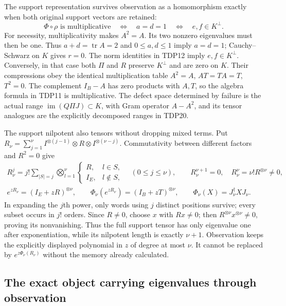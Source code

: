 The support representation survives observation as a homomorphism
exactly when both original support vectors are retained:
\begin{equation}\tag{TDP22}
\Phi\circ\rho\text{ is multiplicative}\quad\Longleftrightarrow\quad
a=d=1\quad\Longleftrightarrow\quad e,f\in K^\perp.
\end{equation}
For necessity, multiplicativity makes $A^2=A$. Its two nonzero
eigenvalues must then be one. Thus $a+d=\operatorname{tr}A=2$ and
$0\le a,d\le1$ imply $a=d=1$; Cauchy--Schwarz on $K$ gives $r=0$.
The norm identities in TDP12 imply $e,f\in K^\perp$. Conversely, in
that case both $\Pi$ and $R$ preserve $K^\perp$ and are zero on $K$.
Their compressions obey the identical multiplication table
$A^2=A$, $AT=TA=T$, $T^2=0$. The complement $I_B-A$ has zero products
with $A,T$, so the algebra formula in TDP11 is multiplicative.
The defect space determined by failure is the actual range
$\operatorname{im}(Q\Pi J)\subset K$, with Gram operator $A-A^2$,
and its tensor analogues are the explicitly decomposed ranges in TDP20.

The support nilpotent also tensors without dropping mixed terms. Put
$R_\nu=\sum_{j=1}^\nu I^{\otimes(j-1)}\otimes R\otimes I^{\otimes(\nu-j)}$.
Commutativity between different factors and $R^2=0$ give
\begin{equation}\tag{TDP23}
\begin{gathered}
R_\nu^j=j!\sum_{|S|=j}\bigotimes_{l=1}^\nu
 \begin{cases}R,&l\in S,\\I_E,&l\notin S,\end{cases}
\quad (0\le j\le\nu),\qquad
R_\nu^{\nu+1}=0,\quad R_\nu^\nu=\nu!R^{\otimes\nu}\ne0,\\
e^{zR_\nu}=(I_E+zR)^{\otimes\nu},\qquad
\Phi_\nu(e^{zR_\nu})=(I_B+zT)^{\otimes\nu},\qquad
\Phi_\nu(X)=J_\nu^\dagger XJ_\nu.
\end{gathered}
\end{equation}
In expanding the $j$th power, only words using $j$ distinct positions
survive; every subset occurs in $j!$ orders. Since $R\ne0$, choose $x$
with $Rx\ne0$; then $R^{\otimes\nu}x^{\otimes\nu}\ne0$, proving its
nonvanishing. Thus the full support tensor has only eigenvalue one
after exponentiation, while its nilpotent length is exactly $\nu+1$.
Observation keeps the explicitly displayed polynomial in $z$ of degree
at most $\nu$. It cannot be replaced by $e^{z\Phi_\nu(R_\nu)}$ without
the memory already calculated.

\subsection{The exact object carrying eigenvalues through observation}

